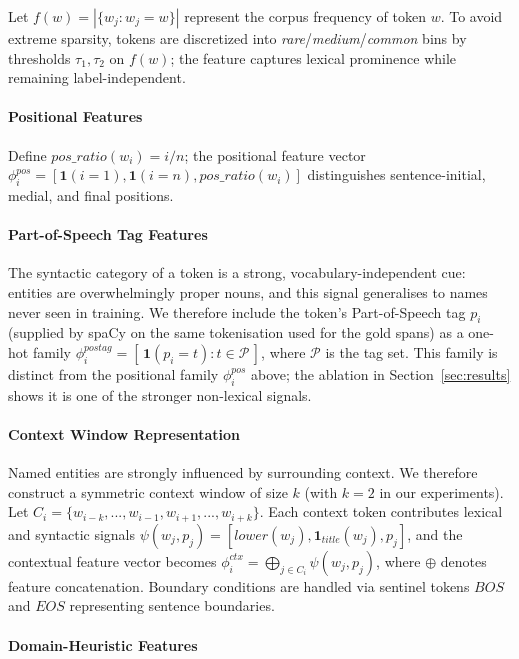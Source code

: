 \documentclass[conference]{IEEEtran}
\begin{document}
Let \(f(w) = |\{w_j : w_j = w\}|\) represent the corpus frequency of token \(w\). To avoid extreme sparsity, tokens are discretized into \emph{rare}/\emph{medium}/\emph{common} bins by thresholds \(\tau_1, \tau_2\) on \(f(w)\); the feature captures lexical prominence while remaining label-independent.

\paragraph{Positional Features}

Define \(pos\_ratio(w_i) = i/n\); the positional feature vector \(\phi_i^{pos} = [\mathbf{1}(i{=}1), \mathbf{1}(i{=}n), pos\_ratio(w_i)]\) distinguishes sentence-initial, medial, and final positions.

\paragraph{Part-of-Speech Tag Features}

The syntactic category of a token is a strong, vocabulary-independent cue: entities are overwhelmingly proper nouns, and this signal generalises to names never seen in training. We therefore include the token's Part-of-Speech tag $p_i$ (supplied by spaCy on the same tokenisation used for the gold spans) as a one-hot family \(\phi_i^{postag} = [\, \mathbf{1}(p_i = t) : t \in \mathcal{P} \,]\), where $\mathcal{P}$ is the tag set. This family is distinct from the positional family $\phi_i^{pos}$ above; the ablation in Section~\ref{sec:results} shows it is one of the stronger non-lexical signals.

\paragraph{Context Window Representation}

Named entities are strongly influenced by surrounding context. We therefore construct a symmetric context window of size \(k\) (with \(k=2\) in our experiments). Let \(C_i = \{w_{i-k},...,w_{i-1},w_{i+1},...,w_{i+k}\}\). Each context token contributes lexical and syntactic signals \(\psi(w_j,p_j) = [lower(w_j), \mathbf{1}_{title}(w_j), p_j]\), and the contextual feature vector becomes \(\phi_i^{ctx} = \bigoplus_{j \in C_i} \psi(w_j,p_j)\), where \(\oplus\) denotes feature concatenation. Boundary conditions are handled via sentinel tokens \(BOS\) and \(EOS\) representing sentence boundaries.

\paragraph{Domain-Heuristic Features}
\end{document}
